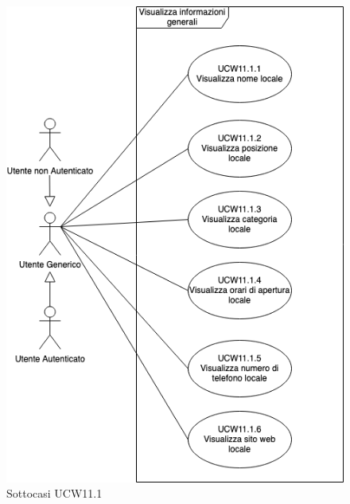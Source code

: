 \begin{figure}[!h]
	\centering
	\includegraphics[scale=0.5]{UC_images/UCW11-1.png} 
	\caption{Sottocasi UCW11.1}
\end{figure}	

